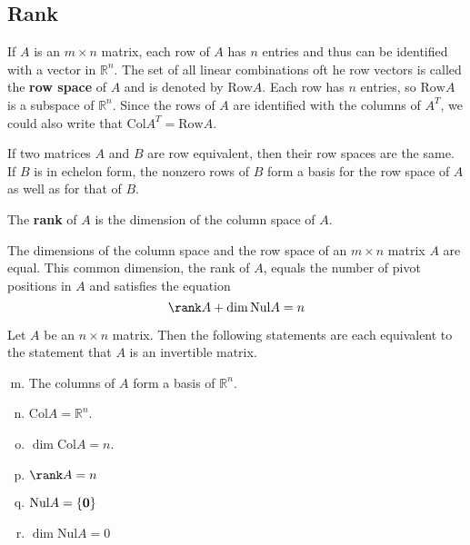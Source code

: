 \documentclass[11pt]{scrartcl}
\theoremstyle{dotlessP}
\theoremstyle{dotlessN}
\DeclarePairedDelimiter\set{\{}{\}}
\newcommand{\reals}{\mathbb{R}} %
\newcommand{\nul}{\text{Nul}}
\newcommand{\col}{\text{Col}}
\newcommand{\row}{\text{Row}}
\begin{document}
\subsection{Rank}
\begin{definition}
	If $A$ is an $m \times n$ matrix, each row of $A$ has $n$ entries and thus can be identified with a vector in $\reals^n$. The set of all linear combinations oft he row vectors is called the \textbf{row space} of $A$ and is denoted by $\row A$. Each row has $n$ entries, so $\row A$ is a subspace of $\reals^n$. Since the rows of $A$ are identified with the columns of $A^T$, we could also write that $\col A^T = \row A$.
\end{definition}
\begin{theorem}
	If two matrices $A$ and $B$ are row equivalent, then their row spaces are the same. If $B$ is in echelon form, the nonzero rows of $B$ form a basis for the row space of $A$ as well as for that of $B$.
\end{theorem}
\begin{definition}
	The \textbf{rank} of $A$ is the dimension of the column space of $A$.
\end{definition}
\begin{theorem}
	The dimensions of the column space and the row space of an $m \times n$ matrix $A$ are equal. This common dimension, the rank of $A$, equals the number of pivot positions in $A$ and satisfies the equation
	\[
	\rank A + \dim \nul A = n
	\] 
\end{theorem}
\begin{theorem}
	Let $A$ be an $n \times n$ matrix. Then the following statements are each equivalent to the statement that $A$ is an invertible matrix.
	\begin{enumerate}[a.]
		\setcounter{enumi}{12}
		\item The columns of $A$ form a basis of $\reals^n$.
		\item $\col A = \reals^n$.
		\item $\dim \col A = n$.
		\item  $\rank A = n$
		\item  $\nul A = \set*{\bm{0}}$
		\item $\dim \nul A = 0$
	\end{enumerate}
\end{theorem}
\end{document}
